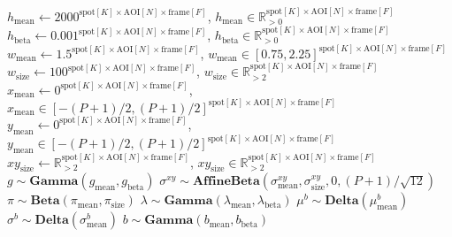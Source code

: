 \begin{algorithmic}[1]
{    $h_\mathrm{mean} \gets 2000^{\mathrm{spot}[K] \times \mathrm{AOI}[N] \times \mathrm{frame}[F]} $, \quad $h_\mathrm{mean} \in \mathbb{R}_{>0}^{\mathrm{spot}[K] \times \mathrm{AOI}[N] \times \mathrm{frame}[F]} $ \\
    $h_\mathrm{beta} \gets 0.001^{\mathrm{spot}[K] \times \mathrm{AOI}[N] \times \mathrm{frame}[F]}$, \quad $h_\mathrm{beta} \in \mathbb{R}_{>0}^{\mathrm{spot}[K] \times \mathrm{AOI}[N] \times \mathrm{frame}[F]}$ \\
    $w_\mathrm{mean} \gets 1.5^{\mathrm{spot}[K] \times \mathrm{AOI}[N] \times \mathrm{frame}[F]}$, \quad $w_\mathrm{mean} \in [0.75, 2.25]^{\mathrm{spot}[K] \times \mathrm{AOI}[N] \times \mathrm{frame}[F]}$ \\
    $w_\mathrm{size} \gets 100^{\mathrm{spot}[K] \times \mathrm{AOI}[N] \times \mathrm{frame}[F]}$, \quad $w_\mathrm{size} \in \mathbb{R}_{>2}^{\mathrm{spot}[K] \times \mathrm{AOI}[N] \times \mathrm{frame}[F]}$ \\
    $x_\mathrm{mean} \gets 0^{\mathrm{spot}[K] \times \mathrm{AOI}[N] \times \mathrm{frame}[F]}$, \quad $x_\mathrm{mean} \in [-(P+1)/2, (P+1)/2]^{\mathrm{spot}[K] \times \mathrm{AOI}[N] \times \mathrm{frame}[F]}$ \\
    $y_\mathrm{mean} \gets 0^{\mathrm{spot}[K] \times \mathrm{AOI}[N] \times \mathrm{frame}[F]}$, \quad $y_\mathrm{mean} \in [-(P+1)/2, (P+1)/2]^{\mathrm{spot}[K] \times \mathrm{AOI}[N] \times \mathrm{frame}[F]}$ \\
    $xy_\mathrm{size} \gets \mathbb{R}_{>2}^{\mathrm{spot}[K] \times \mathrm{AOI}[N] \times \mathrm{frame}[F]}$, \quad $xy_\mathrm{size} \in \mathbb{R}_{>2}^{\mathrm{spot}[K] \times \mathrm{AOI}[N] \times \mathrm{frame}[F]}$
    }
\State $g \sim \mathbf{Gamma}(g_\mathrm{mean}, g_\mathrm{beta})$
\State $\sigma^{xy} \sim \mathbf{AffineBeta}(\sigma^{xy}_\mathrm{mean}, \sigma^{xy}_\mathrm{size}, 0, (P+1) / \sqrt{12})$
\State $\pi \sim \mathbf{Beta}(\pi_\mathrm{mean}, \pi_\mathrm{size})$
\State $\lambda \sim \mathbf{Gamma}(\lambda_\mathrm{mean}, \lambda_\mathrm{beta})$
    \State $\mu^b \sim \mathbf{Delta}(\mu^b_\mathrm{mean})$
    \State $\sigma^b \sim \mathbf{Delta}(\sigma^b_\mathrm{mean})$
        \State $b \sim \mathbf{Gamma}(b_\mathrm{mean}, b_\mathrm{beta})$

\end{algorithmic}
